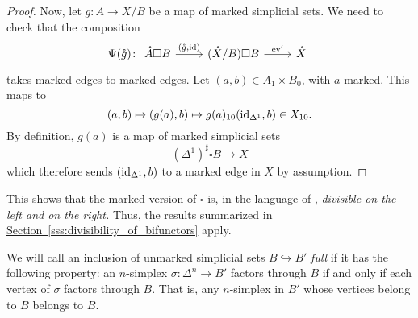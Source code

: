 \documentclass[main.tex]{subfiles}
\begin{document}
\begin{proof}
  Now, let $g\colon A \to X / B$ be a map of marked simplicial sets. We need to check that the composition
  \begin{equation*}
    \Psi(\mathring{g})\colon 
    \begin{tikzcd}
      \mathring{A} \square B
      \arrow[r, "{(\mathring{g}, \id)}"]
      & (\mathring{X} / B) \square B
      \arrow[r, "\ev'"]
      & \mathring{X}
    \end{tikzcd}
  \end{equation*}
  takes marked edges to marked edges. Let $(a, b) \in A_{1} \times B_{0}$, with $a$ marked. This maps to
  \begin{equation*}
    (a, b) \mapsto (g(a), b) \mapsto g(a)_{10}(\mathrm{id}_{\Delta^{1}}, b) \in X_{10}.
  \end{equation*}
  By definition, $g(a)$ is a map of marked simplicial sets
  \begin{equation*}
    (\Delta^{1})^{\sharp} \square B \to X
  \end{equation*}
  which therefore sends $(\mathrm{id}_{\Delta^{1}}, b)$ to a marked edge in $X$ by assumption.
\end{proof}

This shows that the marked version of $\square$ is, in the language of \cite{qcats_vs_segal_spaces}, \emph{divisible on the left and on the right.} Thus, the results summarized in \hyperref[sss:divisibility_of_bifunctors]{Section~\ref*{sss:divisibility_of_bifunctors}} apply.

We will call an inclusion of unmarked simplicial sets $B \hookrightarrow B'$ \emph{full} if it has the following property: an $n$-simplex $\sigma\colon \Delta^{n} \to B'$ factors through $B$ if and only if each vertex of $\sigma$ factors through $B$. That is, any $n$-simplex in $B'$ whose vertices belong to $B$ belongs to $B$.
\end{document}
